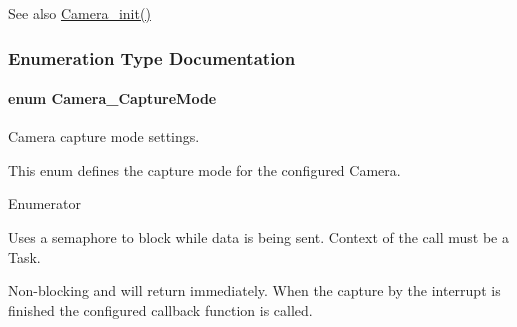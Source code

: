 \begin{DoxySeeAlso}{See also}
\hyperlink{_camera_8h_ab0208c74b70ac5b50cb26c36f1f3ebad}{Camera\+\_\+init()} 
\end{DoxySeeAlso}


\subsubsection{Enumeration Type Documentation}
\paragraph[{Camera\+\_\+\+Capture\+Mode}]{\setlength{\rightskip}{0pt plus 5cm}enum {\bf Camera\+\_\+\+Capture\+Mode}}\label{_camera_8h_a74c8a8a13eebddea16c33c726d096ba8}


Camera capture mode settings. 

This enum defines the capture mode for the configured Camera. \begin{Desc}
\item[Enumerator]\par
\begin{description}
\item[{\em 
Camera\+\_\+\+M\+O\+D\+E\+\_\+\+B\+L\+O\+C\+K\+I\+N\+G\label{_camera_8h_a74c8a8a13eebddea16c33c726d096ba8aad6127b321c6b22ffe1a50caee5a4fe1}
}]Uses a semaphore to block while data is being sent. Context of the call must be a Task. \item[{\em 
Camera\+\_\+\+M\+O\+D\+E\+\_\+\+C\+A\+L\+L\+B\+A\+C\+K\label{_camera_8h_a74c8a8a13eebddea16c33c726d096ba8ae2f15a1a358226aa81d59509f5a31191}
}]Non-\/blocking and will return immediately. When the capture by the interrupt is finished the configured callback function is called. \end{description}
\end{Desc}
